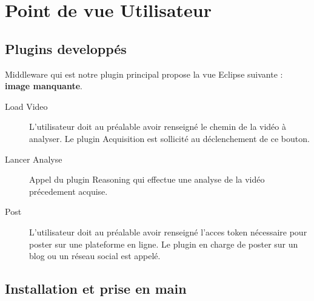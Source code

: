 \chapter{Point de vue Utilisateur}

\section{Plugins developpés}
Middleware qui est notre plugin principal propose la vue Eclipse suivante : \textbf{image manquante}. 
\begin{description}
\item[Load Video]
L'utilisateur doit au préalable avoir renseigné le chemin de la vidéo à analyser. Le plugin Acquisition est sollicité au déclenchement de ce bouton. 
\item[Lancer Analyse]
Appel du plugin Reasoning qui effectue une analyse de la vidéo précedement acquise.
\item[Post]
L'utilisateur doit au préalable avoir renseigné l'acces token nécessaire pour poster sur une plateforme en ligne. 
Le plugin en charge de poster sur un blog ou un réseau social est appelé.
\end{description}
 
\section{Installation et prise en main}
